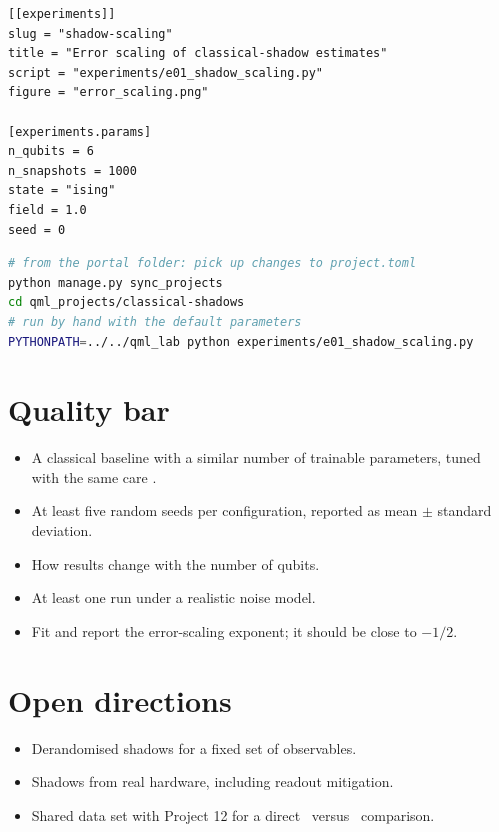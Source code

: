 \documentclass[11pt,a4paper]{article}
\begin{document}
\begin{lstlisting}[language={}]
[[experiments]]
slug = "shadow-scaling"
title = "Error scaling of classical-shadow estimates"
script = "experiments/e01_shadow_scaling.py"
figure = "error_scaling.png"

[experiments.params]
n_qubits = 6
n_snapshots = 1000
state = "ising"
field = 1.0
seed = 0
\end{lstlisting}

\begin{lstlisting}[language=bash]
# from the portal folder: pick up changes to project.toml
python manage.py sync_projects
cd qml_projects/classical-shadows
# run by hand with the default parameters
PYTHONPATH=../../qml_lab python experiments/e01_shadow_scaling.py
\end{lstlisting}

\section{Quality bar}
\begin{itemize}
  \item A classical baseline with a similar number of trainable parameters, tuned with the same care \citep{bowles2024}.
  \item At least five random seeds per configuration, reported as mean $\pm$ standard deviation.
  \item How results change with the number of qubits.
  \item At least one run under a realistic noise model.
  \item Fit and report the error-scaling exponent; it should be close to $-1/2$.
\end{itemize}

\section{Open directions}
\begin{itemize}
  \item Derandomised shadows for a fixed set of observables.
  \item Shadows from real hardware, including readout mitigation.
  \item Shared data set with Project 12 for a direct \QC\ versus \QQ\ comparison.
\end{itemize}
\end{document}
